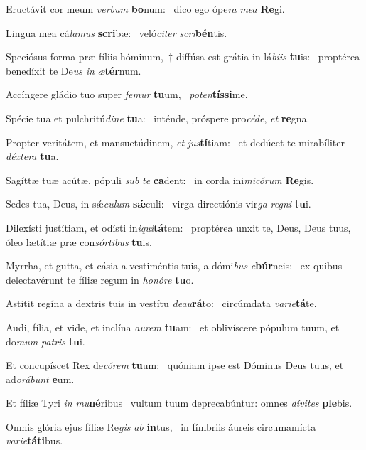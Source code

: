 \item Eructávit cor meum \textit{verbum} \textbf{bo}num:~\psstar{} dico ego ópe\textit{ra} \textit{mea} \textbf{Re}gi.
\item Lingua mea cá\textit{lamus} \textbf{scri}bæ:~\psstar{} veló\textit{citer} \textit{scri}\textbf{bén}tis.
\item Speciósus forma præ fíliis hóminum,~† diffúsa est grátia in lá\textit{biis} \textbf{tu}is:~\psstar{} proptérea benedíxit te De\textit{us} \textit{in} \textit{æ}\textbf{tér}num.
\item Accíngere gládio tuo super \textit{femur} \textbf{tu}um,~\psstar{} \textit{poten}\textbf{tís}\textbf{si}me.
\item Spécie tua et pulchritú\textit{dine} \textbf{tu}a:~\psstar{} inténde, próspere pro\textit{céde}, \textit{et} \textbf{re}gna.
\item Propter veritátem, et mansuetúdinem, \textit{et} \textit{jus}\textbf{tí}tiam:~\psstar{} et dedúcet te mirabíliter \textit{déxtera} \textbf{tu}a.
\item Sagíttæ tuæ acútæ, pópuli \textit{sub} \textit{te} \textbf{ca}dent:~\psstar{} in corda ini\textit{micórum} \textbf{Re}gis.
\item Sedes tua, Deus, in sǽ\textit{culum} \textbf{sǽ}culi:~\psstar{} virga directiónis vir\textit{ga} \textit{regni} \textbf{tu}i.
\item Dilexísti justítiam, et odísti in\textit{iqui}\textbf{tá}tem:~\psstar{} proptérea unxit te, Deus, Deus tuus, óleo lætítiæ præ con\textit{sórtibus} \textbf{tu}is.
\item Myrrha, et gutta, et cásia a vestiméntis tuis, a dómi\textit{bus} \textit{e}\textbf{búr}neis:~\psstar{} ex quibus delectavérunt te fíliæ regum in \textit{honóre} \textbf{tu}o.
\item Astitit regína a dextris tuis in vestítu \textit{deau}\textbf{rá}to:~\psstar{} circúmdata \textit{varie}\textbf{tá}te.
\item Audi, fília, et vide, et inclína \textit{aurem} \textbf{tu}am:~\psstar{} et oblivíscere pópulum tuum, et do\textit{mum} \textit{patris} \textbf{tu}i.
\item Et concupíscet Rex de\textit{córem} \textbf{tu}um:~\psstar{} quóniam ipse est Dóminus Deus tuus, et ad\textit{orábunt} \textbf{e}um.
\item Et fíliæ Tyri \textit{in} \textit{mu}\textbf{né}ribus~\psstar{} vultum tuum deprecabúntur: omnes \textit{dívites} \textbf{ple}bis.
\item Omnis glória ejus fíliæ Re\textit{gis} \textit{ab} \textbf{in}tus,~\psstar{} in fímbriis áureis circumamícta \textit{varie}\textbf{tá}\textbf{ti}bus.
